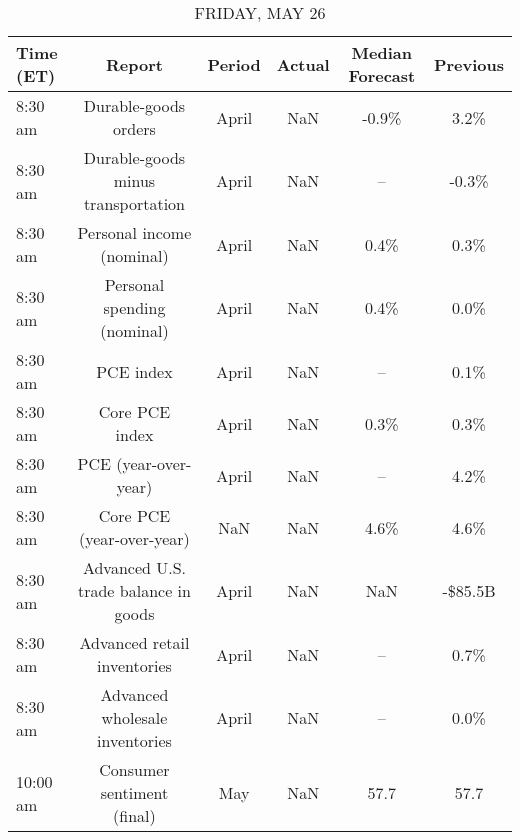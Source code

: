 \documentclass{article}%
\begin{document}
\begin{table}[htbp]%
\caption{FRIDAY, MAY 26}%
\centering%
\begin{adjustbox}{width=1\textwidth}%
\begin{tabular}{lccccc}
\toprule
Time (ET) &                               Report & Period & Actual & Median Forecast & Previous \\
\midrule
  8:30 am &                 Durable-goods orders &  April &    NaN &           -0.9\% &     3.2\% \\
  8:30 am &   Durable-goods minus transportation &  April &    NaN &              -- &    -0.3\% \\
  8:30 am &            Personal income (nominal) &  April &    NaN &            0.4\% &     0.3\% \\
  8:30 am &          Personal spending (nominal) &  April &    NaN &            0.4\% &     0.0\% \\
  8:30 am &                            PCE index &  April &    NaN &              -- &     0.1\% \\
  8:30 am &                       Core PCE index &  April &    NaN &            0.3\% &     0.3\% \\
  8:30 am &                 PCE (year-over-year) &  April &    NaN &              -- &     4.2\% \\
  8:30 am &            Core PCE (year-over-year) &    NaN &    NaN &            4.6\% &     4.6\% \\
  8:30 am & Advanced U.S. trade balance in goods &  April &    NaN &             NaN &  -\$85.5B \\
  8:30 am &          Advanced retail inventories &  April &    NaN &              -- &     0.7\% \\
  8:30 am &       Advanced wholesale inventories &  April &    NaN &              -- &     0.0\% \\
 10:00 am &           Consumer sentiment (final) &    May &    NaN &            57.7 &     57.7 \\
\bottomrule
\end{tabular}
%
\end{adjustbox}%
\end{table}
\end{document}
